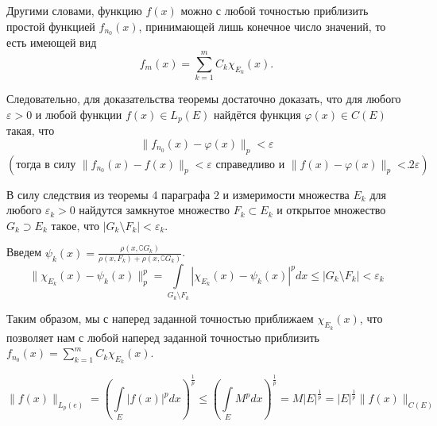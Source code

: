 \documentclass[12pt,a4paper, titlepage]{article}
\begin{document}
Другими словами, функцию $f(x)$ можно с любой точностью приблизить простой функцией $f_{n_0}(x)$, принимающей лишь конечное число значений, то есть имеющей вид
$$
f_m(x) = \sum_{k=1}^m C_k \chi_{E_k}(x).
$$

Следовательно, для доказательства теоремы достаточно доказать, что для любого $\varepsilon > 0$ и любой функции $f(x) \in L_p(E)$ найдётся функция $\varphi (x) \in C(E)$ такая, что 
$$
\|f_{n_0}(x) - \varphi(x)\|_p < \varepsilon
$$
$$(\mbox{тогда в силу } \|f_{n_0}(x) - f(x)\|_p < \varepsilon \mbox{ справедливо и } \|f(x) - \varphi(x)\|_p < 2 \varepsilon ).
$$

В силу следствия из теоремы 4 параграфа 2 и измеримости множества $E_k$ для любого $\varepsilon_k > 0$ найдутся замкнутое множество $F_k \subset E_k$ и открытое множество $G_k \supset E_k$ такое, что $|G_k \setminus F_k| < \varepsilon_k$.%

Введем $\psi_k(x) = \frac{\rho(x, \complement G_k)}{\rho(x, F_k) + \rho(x, \complement G_k)}$.
$$
\|\chi_{E_k}(x) - \psi_k(x)\|_p^p = \int\limits_{G_k \setminus F_k}|\chi_{E_k}(x) - \psi_k(x)|^pdx \leqslant |G_k \setminus F_k| < \varepsilon_k
$$

Таким образом, мы с наперед заданной точностью приближаем $\chi_{E_k}(x)$, что позволяет нам с любой наперед заданной точностью приблизить $f_{n_0}(x) = \sum\limits_{k = 1}^m C_k\chi_{E_k}(x)$.

$$
\|f(x)\|_{L_p(e)} = \left(\int\limits_{E}|f(x)|^p dx \right)^\frac1p \leqslant \left(\int\limits_{E}M^p dx \right)^\frac1p = M|E|^\frac1p = |E|^\frac1p\|f(x)\|_{C(E)}
$$


\end{document}
